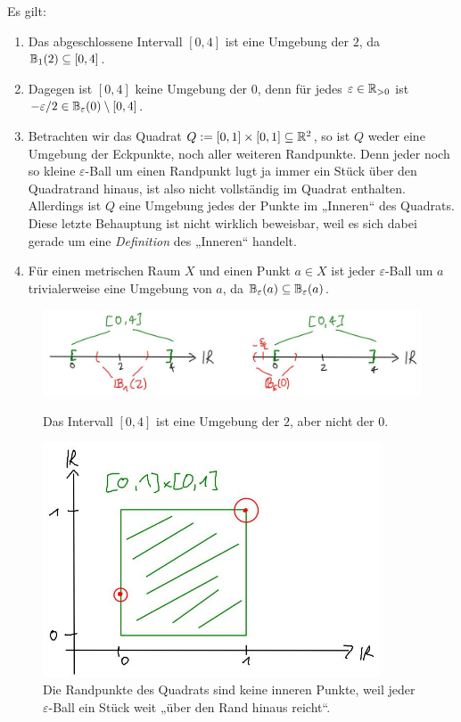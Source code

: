 \begin{bsp}
    Es gilt:
    \begin{enumerate}
        \item Das abgeschlossene Intervall $[0,4]$ ist eine Umgebung der $2$, da $\mathbb B_1(2)\subseteq [0,4]$.
        \item Dagegen ist $[0,4]$ keine Umgebung der $0$, denn für jedes $\varepsilon\in\mathbb R_{>0}$ ist $-\varepsilon/2 \in \mathbb B_\varepsilon(0)\setminus [0,4]$.
        \item Betrachten wir das Quadrat $Q:=[0,1]\times [0,1]\subseteq \mathbb R^2$, so ist $Q$ weder eine Umgebung der Eckpunkte, noch aller weiteren Randpunkte. Denn jeder noch so kleine $\varepsilon$-Ball um einen Randpunkt lugt ja immer ein Stück über den Quadratrand hinaus, ist also nicht vollständig im Quadrat enthalten. Allerdings ist $Q$ eine Umgebung jedes der Punkte im „Inneren“ des Quadrats. Diese letzte Behauptung ist nicht wirklich beweisbar, weil es sich dabei gerade um eine \emph{Definition} des „Inneren“ handelt.
        \item Für einen metrischen Raum $X$ und einen Punkt $a\in X$ ist jeder $\varepsilon$-Ball um $a$ trivialerweise eine Umgebung von $a$, da $\mathbb B_\varepsilon(a)\subseteq\mathbb B_\varepsilon(a)$.
    \end{enumerate}
    \begin{figure}[ht!]
        \includegraphics[width=\textwidth]{./_img/Intervallpunkte.jpeg}
        \centering \caption{Das Intervall $[0,4]$ ist eine Umgebung der $2$, aber nicht der $0$.}
        \includegraphics[width=10cm]{./_img/Quadratpunkte.jpeg}
        \centering \caption{Die Randpunkte des Quadrats sind keine inneren Punkte, weil jeder $\varepsilon$-Ball ein Stück weit „über den Rand hinaus reicht“.}
    \end{figure}
\end{bsp}


